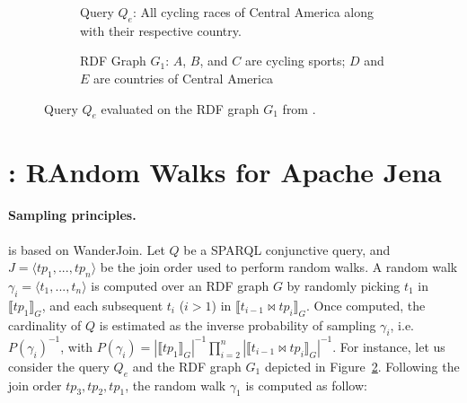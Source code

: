 
\begin{figure}
  \setlength{\fboxsep}{0pt} %
  \begin{subfigure}{0.48\textwidth}
    \caption{\label{fig:q1-j2-1hop}Query $Q_e$: All cycling races of Central America along
      with their respective country.}
  \end{subfigure}
  \hfill
  \begin{subfigure}{0.48\textwidth}
    \fbox{%
      \resizebox{\textwidth}{!}{%
        
    }}
    \caption{RDF Graph $G_1$: $A$, $B$, and $C$ are cycling sports; $D$ and $E$
      are countries of Central America~\cite{10.1007/978-3-031-33455-9_3}}
  \end{subfigure}
  \caption{\label{fig:random_walks_example} Query $Q_e$  evaluated on the RDF graph $G_1$ from \cite{10.1007/978-3-031-33455-9_3}.
    }
\end{figure}

\section{\NAME: RAndom Walks for Apache Jena}
\label{sec:proposal}

\paragraph{Sampling principles.}

\NAME is based on WanderJoin\cite{li2019wanderjoin}.
Let $Q$ be a SPARQL conjunctive query, and $J = \langle tp_1, ..., tp_n \rangle$ be
the join order used to perform random walks. A random walk
$\gamma_i = \langle t_1, ..., t_n\rangle$ is computed over
an RDF graph $G$ by randomly picking $t_1$ in $\llbracket tp_1 \rrbracket_G$,
and each subsequent $t_i$ ($i > 1$) in $\llbracket t_{i-1} \bowtie tp_i \rrbracket_G$.
Once computed, the cardinality of $Q$ is estimated as the inverse probability
of sampling $\gamma_i$, i.e. $P(\gamma_i)^{-1}$, with $P(\gamma_i) = |\llbracket tp_1 \rrbracket_G|^{-1} \prod_{i=2}^{n}
|\llbracket t_{i-1} \bowtie tp_i \rrbracket_G|^{-1}$.
%
For instance, let us consider the query $Q_e$ and the RDF graph $G_1$
depicted in Figure~\ref{fig:random_walks_example}. Following the join order $tp_3,tp_2,tp_1$, the random walk 
$\gamma_1$ is computed as follow:

